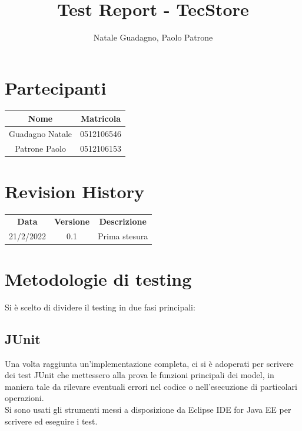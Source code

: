 \documentclass[12pt]{article}
\author{Natale Guadagno, Paolo Patrone}
\title{Test Report - TecStore}
\begin{document}
\maketitle
\newpage
\tableofcontents
\newpage
{}
\section*{Partecipanti}
\begin{center}
\begin{tabular} {|c|c|}
\hline
\textbf{Nome} & \textbf{Matricola} \\
\hline
Guadagno Natale & 0512106546 \\
Patrone Paolo & 0512106153 \\
\hline
\end{tabular}
\end{center}


\section*{Revision History}
\begin{center}
\begin{tabular} {|c|c|c|}
\hline
\textbf{Data} & \textbf{Versione} & \textbf{Descrizione} \\
21/2/2022 & 0.1 & Prima stesura \\
\hline

\hline
\end{tabular}
\end{center}

\newpage

\section{Metodologie di testing}
Si è scelto di dividere il testing in due fasi principali:
\subsection{JUnit}
Una volta raggiunta un'implementazione completa, ci si è adoperati per scrivere dei test JUnit che mettessero alla prova le funzioni principali dei model, in maniera tale da rilevare eventuali errori nel codice o nell'esecuzione di particolari operazioni. \\
Si sono usati gli strumenti messi a disposizione da Eclipse IDE for Java EE per scrivere ed eseguire i test. \\ \\
\end{document}
